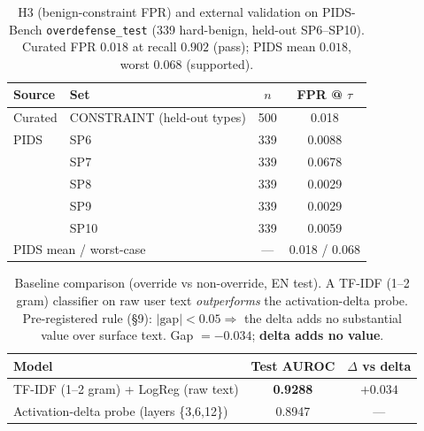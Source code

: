 \begin{table}[t]
\centering
\caption{H3 (benign-constraint FPR) and external validation on PIDS-Bench
\texttt{overdefense\_test} (339 hard-benign, held-out SP6--SP10). Curated FPR
$0.018$ at recall $0.902$ (pass); PIDS mean $0.018$, worst $0.068$ (supported).}
\label{tab:h3}
\begin{tabular}{llcc}
\toprule
Source & Set & $n$ & FPR @ $\tau$ \\
\midrule
Curated & CONSTRAINT (held-out types) & 500 & 0.018 \\
\midrule
PIDS & SP6 & 339 & 0.0088 \\
     & SP7 & 339 & 0.0678 \\
     & SP8 & 339 & 0.0029 \\
     & SP9 & 339 & 0.0029 \\
     & SP10 & 339 & 0.0059 \\
\midrule
\multicolumn{2}{l}{PIDS mean / worst-case} & --- & 0.018 / 0.068 \\
\bottomrule
\end{tabular}
\end{table}

\begin{table}[t]
\centering
\caption{Baseline comparison (override vs non-override, EN test). A TF-IDF
(1--2 gram) classifier on raw user text \emph{outperforms} the activation-delta
probe. Pre-registered rule (\S9): $|\text{gap}|<0.05 \Rightarrow$ the delta adds
no substantial value over surface text. Gap $=-0.034$; \textbf{delta adds no value}.}
\label{tab:baseline}
\begin{tabular}{lcc}
\toprule
Model & Test AUROC & $\Delta$ vs delta \\
\midrule
TF-IDF (1--2 gram) + LogReg (raw text) & \textbf{0.9288} & $+0.034$ \\
Activation-delta probe (layers \{3,6,12\}) & 0.8947 & --- \\
\bottomrule
\end{tabular}
\end{table}


